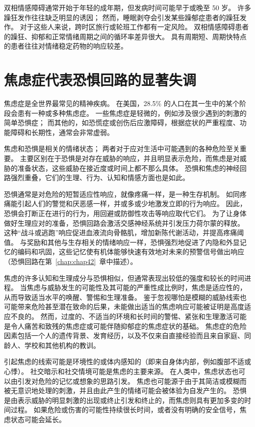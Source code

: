 双相情感障碍通常开始于年轻的成年期，但发病时间可能早于或晚至 50 岁。
许多躁狂发作往往缺乏明显的诱因；
然而，睡眠剥夺会引发某些躁郁症患者的躁狂发作。
对于这些人来说，跨时区旅行或轮班工作都有一定风险。
双相情感障碍患者的躁狂、抑郁和正常情绪周期之间的循环率差异很大。
具有周期短、周期快特点的患者往往对情绪稳定药物的响应较差。



\section{焦虑症代表恐惧回路的显著失调}

焦虑症是全世界最常见的精神疾病。
在美国，28.5\% 的人口在其一生中的某个阶段会患有一种或多种焦虑症。
一些焦虑症是轻微的，例如涉及很少遇到的刺激的简单恐惧症；
而其他的，如恐慌症或创伤后应激障碍，根据症状的严重程度、功能障碍和长期性，通常会非常虚弱。


焦虑和恐惧是相关的情绪状态；
两者对于应对生活中可能遇到的各种危险至关重要。
主要区别在于恐惧是对存在威胁的响应，并且明显表示危险，而焦虑是对威胁的准备状态，这些威胁在接近度或时间上都不那么具体。
恐惧和焦虑的神经回路强烈重叠，它们的生理、行为、认知和情感方面也是如此。


恐惧通常是对危险的短暂适应性响应，就像疼痛一样，是一种生存机制。
如同疼痛能引起人们的警觉和厌恶感一样，并或多或少地激发立即的行为响应。
因此，恐惧会打断正在进行的行为，用回避或防御性攻击等响应取代它们。
为了让身体做好生理应对的准备，恐惧回路会激活交感神经系统并引发压力荷尔蒙的释放。
这种“战斗或逃跑”响应促进血液流向骨骼肌，增加新陈代谢活动，并提高疼痛阈值。
与奖励和其他与生存相关的情绪响应一样，恐惧强烈地促进了内隐和外显记忆的编码和巩固，这些记忆使有机体能够快速有效地对未来的预警信号做出响应（恐惧回路在第~\ref{chap:chap42}~章中描述）。


焦虑的许多认知和生理成分与恐惧相似，但通常表现出较低的强度和较长的时间进程。
当焦虑与威胁发生的可能性及其可能的严重性成比例时，焦虑是适应性的，从而导致适当水平的唤醒、警惕和生理准备。
鉴于忽视哪怕是模糊的威胁线索也可能带来危险甚至潜在致命的后果，未能做出适当的焦虑响应可能被证明是高度适应不良的。
然而，过度的、不适当的环境和长时间的警惕、紧张和生理激活可能是令人痛苦和致残的焦虑症或可能伴随抑郁症的焦虑症状的基础。
焦虑症的危险因素包括一个人的遗传背景、发育经历，以及不仅来自直接经验而且来自家庭、同龄人、学校和其他机构的教训。


引起焦虑的线索可能是环境性的或体内感知的（即来自身体内部，例如腹部不适或心悸）。
社交暗示和社交情境可能是焦虑的主要来源。
在人类中，焦虑状态也可以由引发对危险的记忆或想象的思路引发。
焦虑也可能源于由于其简洁或模糊而被无意识地处理的刺激，并且由此产生的情绪可能会被体验为自发产生的。
恐惧是由表示威胁的明显刺激的出现或终止引发和终止的，而焦虑则具有更加多变的时间过程。
如果危险或伤害的可能性持续很长时间，或者没有明确的安全信号，焦虑状态可能会延长。


